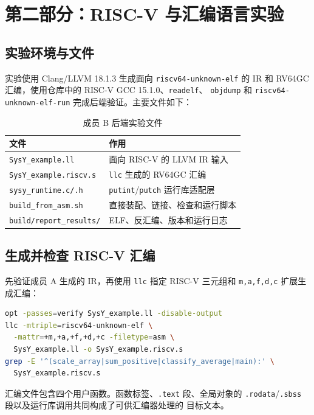 \documentclass[a4paper]{article}
\begin{document}
\section{第二部分：RISC-V 与汇编语言实验}

\subsection{实验环境与文件}

实验使用 Clang/LLVM 18.1.3 生成面向 \texttt{riscv64-unknown-elf} 的 IR 和
RV64GC 汇编，使用仓库中的 RISC-V GCC 15.1.0、\texttt{readelf}、
\texttt{objdump} 和 \texttt{riscv64-unknown-elf-run} 完成后端验证。主要文件如下：

\begin{table}[H]
  \centering
  \caption{成员 B 后端实验文件}
  \label{tab:backend-files}
  \begin{tabular}{p{}p{}}
    \toprule
    文件 & 作用 \\
    \midrule
    \texttt{SysY\_example.ll} & 面向 RISC-V 的 LLVM IR 输入 \\
    \texttt{SysY\_example.riscv.s} & \texttt{llc} 生成的 RV64GC 汇编 \\
    \texttt{sysy\_runtime.c/.h} & \texttt{putint}/\texttt{putch} 运行库适配层 \\
    \texttt{build\_from\_asm.sh} & 直接装配、链接、检查和运行脚本 \\
    \texttt{build/report\_results/} & ELF、反汇编、版本和运行日志 \\
    \bottomrule
  \end{tabular}
\end{table}

\subsection{生成并检查 RISC-V 汇编}

先验证成员 A 生成的 IR，再使用 \texttt{llc} 指定 RISC-V 三元组和
\texttt{m,a,f,d,c} 扩展生成汇编：

\begin{lstlisting}[language=bash,caption={LLVM IR 到 RISC-V 汇编}]
opt -passes=verify SysY_example.ll -disable-output
llc -mtriple=riscv64-unknown-elf \
  -mattr=+m,+a,+f,+d,+c -filetype=asm \
  SysY_example.ll -o SysY_example.riscv.s
grep -E '^(scale_array|sum_positive|classify_average|main):' \
  SysY_example.riscv.s
\end{lstlisting}

汇编文件包含四个用户函数。函数标签、\texttt{.text} 段、全局对象的
\texttt{.rodata}/\texttt{.sbss} 段以及运行库调用共同构成了可供汇编器处理的
目标文本。
\end{document}
